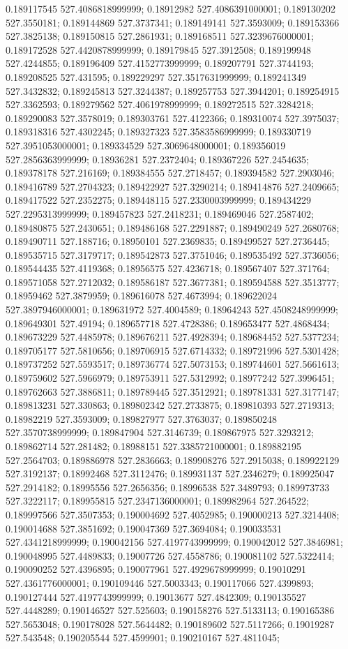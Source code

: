 0.189117545 527.4086818999999; 0.18912982 527.4086391000001; 0.189130202 527.3550181; 0.189144869 527.3737341; 0.189149141 527.3593009; 0.189153366 527.3825138; 0.189150815 527.2861931; 0.189168511 527.3239676000001; 0.189172528 527.4420878999999; 0.189179845 527.3912508; 0.189199948 527.4244855; 0.189196409 527.4152773999999; 0.189207791 527.3744193; 0.189208525 527.431595; 0.189229297 527.3517631999999; 0.189241349 527.3432832; 0.189245813 527.3244387; 0.189257753 527.3944201; 0.189254915 527.3362593; 0.189279562 527.4061978999999; 0.189272515 527.3284218; 0.189290083 527.3578019; 0.189303761 527.4122366; 0.189310074 527.3975037; 0.189318316 527.4302245; 0.189327323 527.3583586999999; 0.189330719 527.3951053000001; 0.189334529 527.3069648000001; 0.189356019 527.2856363999999; 0.18936281 527.2372404; 0.189367226 527.2454635; 0.189378178 527.216169; 0.189384555 527.2718457; 0.189394582 527.2903046; 0.189416789 527.2704323; 0.189422927 527.3290214; 0.189414876 527.2409665; 0.189417522 527.2352275; 0.189448115 527.2330003999999; 0.189434229 527.2295313999999; 0.189457823 527.2418231; 0.189469046 527.2587402; 0.189480875 527.2430651; 0.189486168 527.2291887; 0.189490249 527.2680768; 0.189490711 527.188716; 0.18950101 527.2369835; 0.189499527 527.2736445; 0.189535715 527.3179717; 0.189542873 527.3751046; 0.189535492 527.3736056; 0.189544435 527.4119368; 0.18956575 527.4236718; 0.189567407 527.371764; 0.189571058 527.2712032; 0.189586187 527.3677381; 0.189594588 527.3513777; 0.18959462 527.3879959; 0.189616078 527.4673994; 0.189622024 527.3897946000001; 0.189631972 527.4004589; 0.18964243 527.4508248999999; 0.189649301 527.49194; 0.189657718 527.4728386; 0.189653477 527.4868434; 0.189673229 527.4485978; 0.189676211 527.4928394; 0.189684452 527.5377234; 0.189705177 527.5810656; 0.189706915 527.6714332; 0.189721996 527.5301428; 0.189737252 527.5593517; 0.189736774 527.5073153; 0.189744601 527.5661613; 0.189759602 527.5966979; 0.189753911 527.5312992; 0.18977242 527.3996451; 0.189762663 527.3886811; 0.189789445 527.3512921; 0.189781331 527.3177147; 0.189813231 527.330863; 0.189802342 527.2733875; 0.189810393 527.2719313; 0.18982219 527.3593009; 0.189827977 527.3763037; 0.189850248 527.3570738999999; 0.189847904 527.3146739; 0.189867975 527.3293212; 0.189862714 527.281482; 0.18988151 527.3385721000001; 0.189882195 527.2564703; 0.189886978 527.2836663; 0.189908276 527.2915038; 0.189922129 527.3192137; 0.18992468 527.3112476; 0.189931137 527.2346279; 0.189925047 527.2914182; 0.18995556 527.2656356; 0.18996538 527.3489793; 0.189973733 527.3222117; 0.189955815 527.2347136000001; 0.189982964 527.264522; 0.189997566 527.3507353; 0.190004692 527.4052985; 0.190000213 527.3214408; 0.190014688 527.3851692; 0.190047369 527.3694084; 0.190033531 527.4341218999999; 0.190042156 527.4197743999999; 0.190042012 527.3846981; 0.190048995 527.4489833; 0.19007726 527.4558786; 0.190081102 527.5322414; 0.190090252 527.4396895; 0.190077961 527.4929678999999; 0.19010291 527.4361776000001; 0.190109446 527.5003343; 0.190117066 527.4399893; 0.190127444 527.4197743999999; 0.19013677 527.4842309; 0.190135527 527.4448289; 0.190146527 527.525603; 0.190158276 527.5133113; 0.190165386 527.5653048; 0.190178028 527.5644482; 0.190189602 527.5117266; 0.19019287 527.543548; 0.190205544 527.4599901; 0.190210167 527.4811045; 